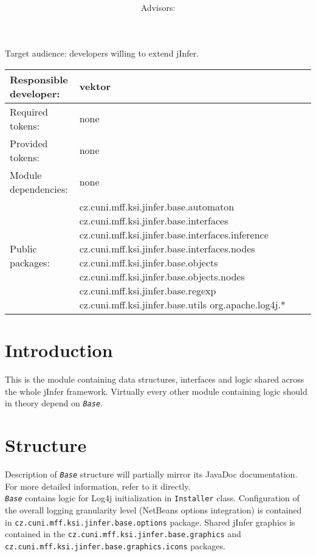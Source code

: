 \documentclass[a4paper,10pt,oneside]{article}
\title{\bf\mftitle}
\author{\mfauthor \\ Advisors: \mfadvisor}
\date{\mfplacedate}
\newcommand{\code}[1]{\texttt{#1}}
\newcommand{\jmodule}[1]{\texttt{\textit{#1}}}
\begin{document}
\maketitle
\noindent Target audience: developers willing to extend jInfer.

\noindent \begin{tabular}{|l|l|} \hline
Responsible developer: & vektor \\ \hline
Required tokens:       & none \\ \hline
Provided tokens:       & none \\ \hline
Module dependencies:   & none \\ \hline
Public packages:       & cz.cuni.mff.ksi.jinfer.base.automaton \newline
cz.cuni.mff.ksi.jinfer.base.interfaces \newline
cz.cuni.mff.ksi.jinfer.base.interfaces.inference \newline
cz.cuni.mff.ksi.jinfer.base.interfaces.nodes \newline
cz.cuni.mff.ksi.jinfer.base.objects \newline
cz.cuni.mff.ksi.jinfer.base.objects.nodes \newline
cz.cuni.mff.ksi.jinfer.base.regexp \newline
cz.cuni.mff.ksi.jinfer.base.utils \newline
org.apache.log4j.* \\ \hline
\end{tabular}

\section{Introduction}

This is the module containing data structures, interfaces and logic shared across the whole jInfer framework. Virtually every other module containing logic should in theory depend on \jmodule{Base}.

\section{Structure}

Description of \jmodule{Base} structure will partially mirror its JavaDoc documentation. For more detailed information, refer to it directly.\\

\jmodule{Base} contains logic for Log4j initialization in \code{Installer} class. Configuration of the overall logging granularity level (NetBeans options integration) is contained in \code{cz.cuni.mff.ksi.jinfer.base.options} package. Shared jInfer graphics is contained in the \code{cz.cuni.mff.ksi.jinfer.base.graphics} and \code{cz.cuni.mff.ksi.jinfer.base.graphics.icons} packages.
\end{document}
